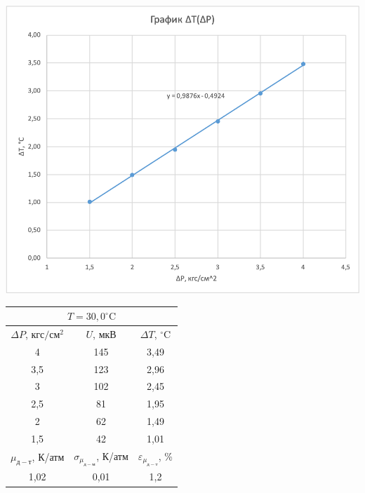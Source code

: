 \documentclass[a4paper, 12pt]{article}
\begin{document}
\begin{table}[pt]
        \vspace{0.5cm}
        
        \begin{minipage}[ht]{0.55\linewidth}
            \includegraphics[width=\linewidth]{images/ch3.png}
        \end{minipage}
        \hfill
        \begin{minipage}[ht]{0.47\linewidth}
            \begin{tabular}{|c|c|c|}
                \hline
                \multicolumn{3}{|c|}{$T = 30,0^{\circ}\text{C}$} \\
                \hline
                $\Delta P$, $кгс/см^2$ & $U$, $мкВ$ & $\Delta T$, $^{\circ}\text{C}$ \\
                \hline
                4 & 145 & 3,49 \\
                \hline
                3,5 & 123 & 2,96 \\
                \hline
                3 & 102 & 2,45 \\
                \hline
                2,5 & 81 & 1,95 \\
                \hline
                2 & 62 & 1,49 \\
                \hline
                1,5 & 42 & 1,01 \\
                \hline
                $\mu_{д-т}$, К/атм & $\sigma_{\mu_{д-м}}$, К/атм & $\varepsilon_{\mu_{д-т}}$, \% \\
                \hline
                1,02 & 0,01 & 1,2 \\
                \hline
            \end{tabular}
        \end{minipage}
        
    \end{table}
    
\end{document}
